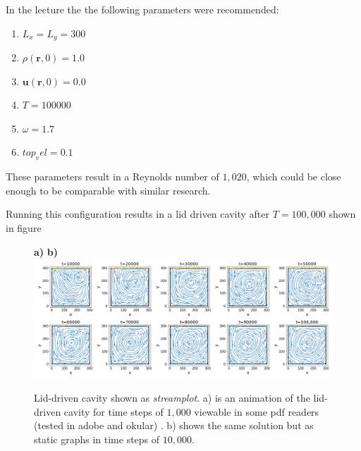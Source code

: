\documentclass[a4paper,11pt, oneside]{book}
\begin{document}
In the lecture the the following parameters were recommended:
\begin{enumerate}
    \item $L_x = L_y = 300$
    \item $\rho(\textbf{r},0) = 1.0$
    \item $\textbf{u}(\textbf{r},0) = 0.0$
    \item $T = 100000$
    \item $\omega = 1.7$
    \item $top_vel = 0.1$
\end{enumerate}
These parameters result in a Reynolds number of $1,020$, which could be close enough to be comparable with similar research.

Running this configuration results in a lid driven cavity  after $T=100,000$ shown in figure \
\begin{figure}[ht]
\centering
\textbf{\large a)}
\textbf{\large b)}
\includegraphics[width=\columnwidth]{milestones/final/img/m6-1-vels.png}
\caption[Lid-driven cavity]{Lid-driven cavity shown as \textit{streamplot}. a) is an animation of the lid-driven cavity for time steps of $1,000$ viewable in some pdf readers (tested in adobe and okular) . b) shows the same solution but as static graphs in time steps of $10,000$. }
\label{fig:m6-1}
\end{figure}





\end{document}
